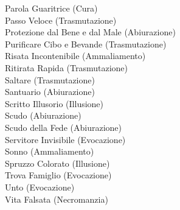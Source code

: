 \begin{multicols}{3}
	Parola Guaritrice (Cura)\\
	Passo Veloce (Trasmutazione)\\
	Protezione dal Bene e dal Male (Abiurazione)\\
	Purificare Cibo e Bevande (Trasmutazione)\\
	Risata Incontenibile (Ammaliamento)\\
	Ritirata Rapida (Trasmutazione)\\
	Saltare (Trasmutazione)\\
	Santuario (Abiurazione)\\
	Scritto Illusorio (Illusione)\\
	Scudo (Abiurazione)\\
	Scudo della Fede (Abiurazione)\\
	Servitore Invisibile (Evocazione)\\
	Sonno (Ammaliamento)\\
	Spruzzo Colorato (Illusione)\\
	Trova Famiglio (Evocazione)\\
	Unto (Evocazione)\\
	Vita Falsata (Necromanzia)\\
	

\end{multicols}
